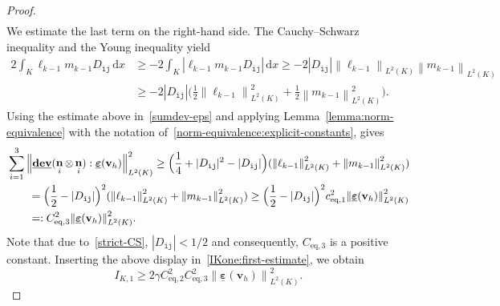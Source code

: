 \documentclass[a4paper,twoside,10pt]{article}
\theoremstyle{plain}
\theoremstyle{remark}
\theoremstyle{definition}
\numberwithin{equation}{section}
\numberwithin{figure}{section}
\newcommand{\Norm}[1]{{\left\|{#1} \right\|}}
\newcommand{\K}{K}
\newcommand{\vbfh}{\mathbf{v}_h}
\DeclareMathOperator{\dev}{\underline{\mathbf{dev}}}
\DeclareMathOperator{\norm}{\bf{n}}
\newcommand{\Ltwo}{L^2}
\newcommand{\dx}{\, \mathrm{d}x}
\newcommand{\epsbfun}{\underline{\boldsymbol{\varepsilon}}}
\newcommand{\lkmo}{\ell_{k-1}}
\newcommand{\mkmo}{m_{k-1}}
\newcommand{\itt}{\mathtt{i}}
\newcommand{\jtt}{\mathtt{j}}
\newcommand{\normi}{\norm_i}
\newcommand{\ceqone}{c_{\text{eq},1}}
\newcommand{\Ceqtwo}{C_{\text{eq},2}}
\newcommand{\Ceqthree}{C_{\text{eq},3}}
\newcommand{\IKone}{I_{\K,1}}
\begin{document}
\begin{proof}
\begin{equation}
\begin{split}
\end{split}
\end{equation}
We estimate the last term on the right-hand side.
The Cauchy--Schwarz inequality and
the Young inequality
yield
\begin{equation*}
\begin{split}
2\int_\K\lkmo\mkmo D_{\itt\jtt}\dx
&\geq - 2\int_\K|\lkmo\mkmo D_{\itt\jtt}|\dx 
\geq - 2|D_{\itt\jtt}|\Norm{\lkmo}_{\Ltwo(\K)}\Norm{\mkmo}_{\Ltwo(\K)} \\
&\geq - 2|D_{\itt\jtt}|\big(\frac12\Norm{\lkmo}^2_{\Ltwo(\K)} + \frac12\Norm{\mkmo}^2_{\Ltwo(\K)}\big).
\end{split}
\end{equation*}
Using the estimate above in~\eqref{sumdev-eps}
and applying Lemma~\ref{lemma:norm-equivalence}
with the notation of~\eqref{norm-equivalence:explicit-constants},
gives
\begin{equation*}
\begin{split}
&\sum_{i = 1}^3\Norm{\dev(\normi\otimes\normi):\epsbfun(\vbfh)}_{\Ltwo(\K)}^2 
\geq \Big(\frac14+|D_{\itt\jtt}|^2-|D_{\itt\jtt}|\Big)(\Norm{\lkmo}^2_{\Ltwo(\K)} + \Norm{\mkmo}^2_{\Ltwo(\K)}) \\
&\qquad= \Big(\frac12-|D_{\itt\jtt}|\Big)^2(\Norm{\lkmo}^2_{\Ltwo(\K)} + \Norm{\mkmo}^2_{\Ltwo(\K)})
\geq \Big(\frac12-|D_{\itt\jtt}|\Big)^2\ceqone^2\Norm{\epsbfun(\vbfh)}^2_{\Ltwo(\K)} \\
&\qquad=: \Ceqthree^2\Norm{\epsbfun(\vbfh)}^2_{\Ltwo(\K)}.
\end{split}
\end{equation*}
Note that due to~\eqref{strict-CS}, $|D_{\itt\jtt}|<1/2$ and
consequently, $\Ceqthree$ is a positive constant.
Inserting the above display in~\eqref{IKone:first-estimate},
we obtain
\begin{equation} \label{IKone}
\IKone \geq 2\gamma\Ceqtwo^2\Ceqthree^2\Norm{\epsbfun(\vbfh)}_{\Ltwo(\K)}^2.
\end{equation}


\end{proof}
\end{document}
